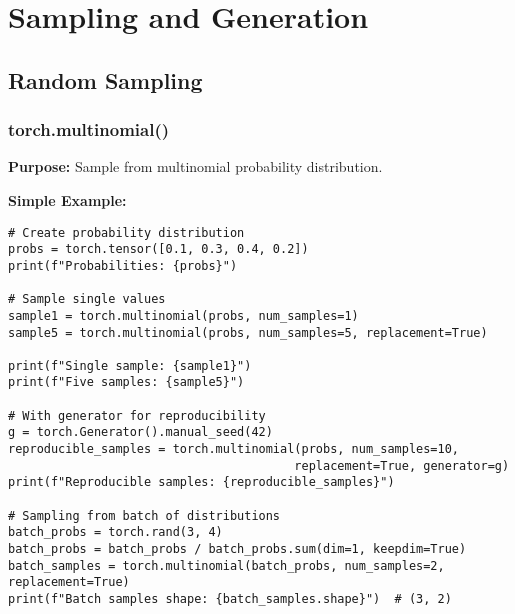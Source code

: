 \documentclass[11pt,a4paper]{book}
\begin{document}
\chapter{Sampling and Generation}

\section{Random Sampling}

\subsection{torch.multinomial()}

\textbf{Purpose:} Sample from multinomial probability distribution.

\textbf{Simple Example:}
\begin{verbatim}
# Create probability distribution
probs = torch.tensor([0.1, 0.3, 0.4, 0.2])
print(f"Probabilities: {probs}")

# Sample single values
sample1 = torch.multinomial(probs, num_samples=1)
sample5 = torch.multinomial(probs, num_samples=5, replacement=True)

print(f"Single sample: {sample1}")
print(f"Five samples: {sample5}")

# With generator for reproducibility
g = torch.Generator().manual_seed(42)
reproducible_samples = torch.multinomial(probs, num_samples=10, 
                                        replacement=True, generator=g)
print(f"Reproducible samples: {reproducible_samples}")

# Sampling from batch of distributions
batch_probs = torch.rand(3, 4)
batch_probs = batch_probs / batch_probs.sum(dim=1, keepdim=True)
batch_samples = torch.multinomial(batch_probs, num_samples=2, replacement=True)
print(f"Batch samples shape: {batch_samples.shape}")  # (3, 2)
\end{verbatim}
\end{document}
